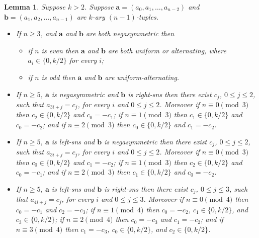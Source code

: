 \documentclass[a4paper,11pt]{article}
\theoremstyle{plain}
\newtheorem{lemma}{Lemma}[section]
\theoremstyle{definition}
\theoremstyle{remark}
\begin{document}
\begin{lemma}  \label{lemma:NOS-constraint-interactions}
Suppose $k>2$.  Suppose $\mathbf{a}=(a_0,a_1,\dots,a_{n-2})$ and
$\mathbf{b}=(a_1,a_2,\dots,a_{n-1})$ are $k$-ary $(n-1)$-tuples.
\begin{itemize}
\item[i)] If $n\geq3$, and $\mathbf{a}$ and $\mathbf{b}$ are both negasymmetric then
    \begin{itemize}
    \item if $n$ is even then $\mathbf{a}$ and $\mathbf{b}$ are both uniform or
        alternating, where $a_i\in\{0,k/2\}$ for every $i$;
    \item if $n$ is odd then $\mathbf{a}$ and $\mathbf{b}$ are uniform-alternating.
    \end{itemize}

\item[ii)] If $n\geq5$, $\mathbf{a}$ is negasymmetric and $\mathbf{b}$ is right-sns then there
    exist $c_j$, $0\leq j\leq2$, such that $a_{3i+j}=c_j$, for every $i$ and $0\leq j\leq 2$.
    Moreover if $n\equiv0\pmod3$ then $c_2\in\{0,k/2\}$ and $c_0=-c_1$; if $n\equiv1\pmod3$
    then $c_1\in\{0,k/2\}$ and $c_0=-c_2$; and if $n\equiv2\pmod3$ then $c_0\in\{0,k/2\}$ and
    $c_1=-c_2$.

\item[iii)] If $n\geq5$, $\mathbf{a}$ is left-sns and $\mathbf{b}$ is negasymmetric then there
    exist $c_j$, $0\leq j\leq2$, such that $a_{3i+j}=c_j$, for every $i$ and $0\leq j\leq 2$.
    Moreover if $n\equiv0\pmod3$ then $c_0\in\{0,k/2\}$ and $c_1=-c_2$; if $n\equiv1\pmod3$
    then $c_2\in\{0,k/2\}$ and $c_0=-c_1$; and if $n\equiv2\pmod3$ then $c_1\in\{0,k/2\}$ and
    $c_0=-c_2$.

\item[iv)] If $n\geq5$, $\mathbf{a}$ is left-sns and $\mathbf{b}$ is right-sns then there exist
    $c_j$, $0\leq j\leq3$, such that $a_{4i+j}=c_j$, for every $i$ and $0\leq j\leq 3$.
    Moreover if $n\equiv0\pmod4$ then $c_0=-c_1$ and $c_2=-c_3$; if $n\equiv1\pmod4$ then
    $c_0=-c_2$, $c_1\in\{0,k/2\}$, and $c_3\in\{0,k/2\}$; if $n\equiv2\pmod4$ then $c_0=-c_3$
    and $c_1=-c_2$; and if $n\equiv3\pmod4$ then $c_1=-c_3$, $c_0\in\{0,k/2\}$, and
    $c_2\in\{0,k/2\}$.
\end{itemize}
\end{lemma}
\end{document}
